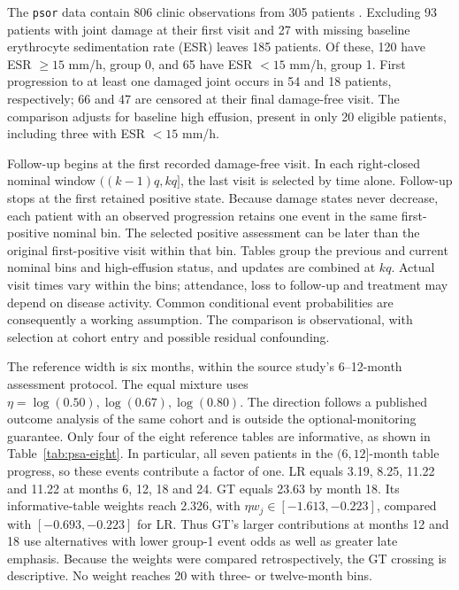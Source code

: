 \documentclass[12pt]{article}
\theoremstyle{definition}
\theoremstyle{remark}
\begin{document}
The \texttt{psor} data contain 806 clinic observations from 305 patients \citep{Jackson2011msm,GladmanFarewell1999}. Excluding 93 patients with joint damage at their first visit and 27 with missing baseline erythrocyte sedimentation rate (ESR) leaves 185 patients. Of these, 120 have ESR $\geq15$ mm/h, group 0, and 65 have ESR $<15$ mm/h, group 1. First progression to at least one damaged joint occurs in 54 and 18 patients, respectively; 66 and 47 are censored at their final damage-free visit. The comparison adjusts for baseline high effusion, present in only 20 eligible patients, including three with ESR $<15$ mm/h.

Follow-up begins at the first recorded damage-free visit. In each right-closed nominal window $((k-1)q,kq]$, the last visit is selected by time alone. Follow-up stops at the first retained positive state. Because damage states never decrease, each patient with an observed progression retains one event in the same first-positive nominal bin. The selected positive assessment can be later than the original first-positive visit within that bin. Tables group the previous and current nominal bins and high-effusion status, and updates are combined at $kq$. Actual visit times vary within the bins; attendance, loss to follow-up and treatment may depend on disease activity. Common conditional event probabilities are consequently a working assumption. The comparison is observational, with selection at cohort entry and possible residual confounding.

The reference width is six months, within the source study's 6--12-month assessment protocol. The equal mixture uses $\eta=\log(0.50),\log(0.67),\log(0.80)$. The direction follows a published outcome analysis of the same cohort and is outside the optional-monitoring guarantee. Only four of the eight reference tables are informative, as shown in Table~\ref{tab:psa-eight}. In particular, all seven patients in the $(6,12]$-month table progress, so these events contribute a factor of one. LR equals 3.19, 8.25, 11.22 and 11.22 at months 6, 12, 18 and 24. GT equals 23.63 by month 18. Its informative-table weights reach 2.326, with $\eta w_j\in[-1.613,-0.223]$, compared with $[-0.693,-0.223]$ for LR. Thus GT's larger contributions at months 12 and 18 use alternatives with lower group-1 event odds as well as greater late emphasis. Because the weights were compared retrospectively, the GT crossing is descriptive. No weight reaches 20 with three- or twelve-month bins.
\end{document}

